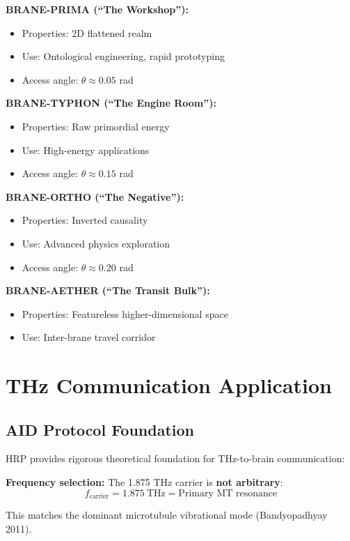 \textbf{BRANE-PRIMA (``The Workshop''):}
\begin{itemize}
\item Properties: 2D flattened realm
\item Use: Ontological engineering, rapid prototyping
\item Access angle: $\theta \approx 0.05$ rad
\end{itemize}

\textbf{BRANE-TYPHON (``The Engine Room''):}
\begin{itemize}
\item Properties: Raw primordial energy
\item Use: High-energy applications
\item Access angle: $\theta \approx 0.15$ rad
\end{itemize}

\textbf{BRANE-ORTHO (``The Negative''):}
\begin{itemize}
\item Properties: Inverted causality
\item Use: Advanced physics exploration
\item Access angle: $\theta \approx 0.20$ rad
\end{itemize}

\textbf{BRANE-AETHER (``The Transit Bulk''):}
\begin{itemize}
\item Properties: Featureless higher-dimensional space
\item Use: Inter-brane travel corridor
\end{itemize}

\section{THz Communication Application}

\subsection{AID Protocol Foundation}

HRP provides rigorous theoretical foundation for THz-to-brain communication:

\textbf{Frequency selection:} The 1.875 THz carrier is \textbf{not arbitrary}:
\begin{equation}
f_{\text{carrier}} = 1.875\ \text{THz} = \text{Primary MT resonance}
\end{equation}

This matches the dominant microtubule vibrational mode (Bandyopadhyay 2011).

